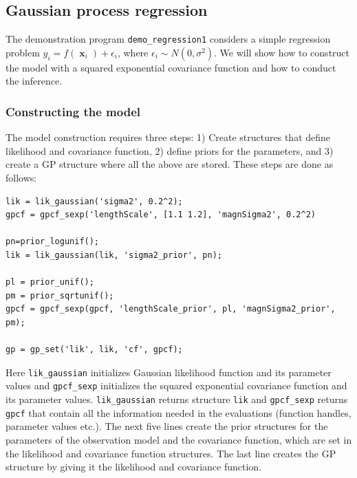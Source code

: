 \documentclass[twoside,11pt]{article}
\DeclareMathOperator{\x}{\mathbf{x}}
\newcommand{\pkg}[1]{{\fontseries{b}\selectfont #1}}
\newcommand{\code}[1]{{\normalfont\texttt{#1}}}
\begin{document}



\subsection{Gaussian process regression}\label{sec:demo_regression1}

The demonstration program \code{demo\_regression1} considers a simple
regression problem $y_i = f(\x_i) + \epsilon_i$, where $\epsilon_i
\sim N(0,\sigma^2)$.  We will show how to construct the model with a
squared exponential covariance function and how to conduct the
inference.

\subsubsection{Constructing the model}

The model construction requires three steps: 1) Create structures that
define likelihood and covariance function, 2) define priors for the
parameters, and 3) create a GP structure where all the above are
stored. These steps are done as follows:
%
\begin{verbatim}
lik = lik_gaussian('sigma2', 0.2^2);
gpcf = gpcf_sexp('lengthScale', [1.1 1.2], 'magnSigma2', 0.2^2)

pn=prior_logunif();
lik = lik_gaussian(lik, 'sigma2_prior', pn);

pl = prior_unif();
pm = prior_sqrtunif();
gpcf = gpcf_sexp(gpcf, 'lengthScale_prior', pl, 'magnSigma2_prior', pm);

gp = gp_set('lik', lik, 'cf', gpcf);
\end{verbatim}
%
Here \code{lik\_gaussian} initializes Gaussian likelihood function and
its parameter values and \code{gpcf\_sexp} initializes the squared
exponential covariance function and its parameter values.
\code{lik\_gaussian} returns structure \code{lik} and
\code{gpcf\_sexp} returns \code{gpcf} that contain all the information
needed in the evaluations (function handles, parameter values etc.).
The next five lines create the prior structures for the parameters of
the observation model and the covariance function, which are set in the
likelihood and covariance function structures. 
%
The last line creates the GP structure by giving it the likelihood
and covariance function.
\end{document}

